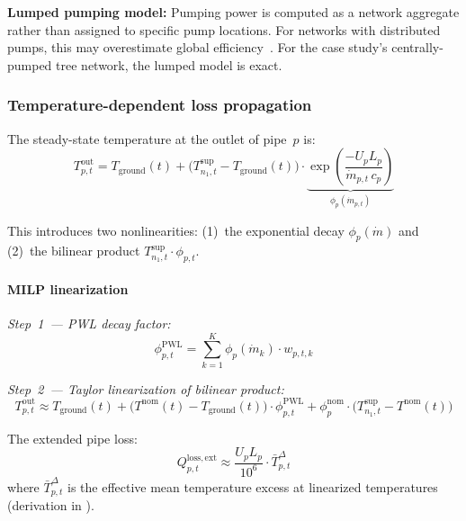 \documentclass[review,3p]{elsarticle}
\begin{document}
\textbf{Lumped pumping model:} Pumping power is computed as a network
aggregate rather than assigned to specific pump locations. For
networks with distributed pumps, this may overestimate global
efficiency~\cite{Hari2024}. For the case study's centrally-pumped tree
network, the lumped model is exact.

\subsubsection{Temperature-dependent loss propagation}
\label{sec:model_temp_prop}

The steady-state temperature at the outlet of pipe~$p$ is:
%
\begin{equation}
  T_{p,t}^{\mathrm{out}} = T_{\mathrm{ground}}(t)
    + \bigl(T_{n_1,t}^{\mathrm{sup}} - T_{\mathrm{ground}}(t)\bigr)
    \cdot \underbrace{\exp\!\left(
      \frac{-U_p L_p}{\dot{m}_{p,t}\, c_p}
    \right)}_{\displaystyle\phi_p(\dot{m}_{p,t})}
  \label{eq:temp_prop}
\end{equation}

This introduces two nonlinearities: (1)~the exponential decay
$\phi_p(\dot{m})$ and (2)~the bilinear product
$T_{n_1,t}^{\mathrm{sup}} \cdot \phi_{p,t}$.

\paragraph{MILP linearization}
\emph{Step~1~--- PWL decay factor:}
\begin{equation}
  \phi_{p,t}^{\mathrm{PWL}} = \sum_{k=1}^{K}
    \phi_p(\dot{m}_k) \cdot w_{p,t,k}
  \label{eq:decay_pwl}
\end{equation}

\emph{Step~2~--- Taylor linearization of bilinear product:}
\begin{equation}
  T_{p,t}^{\mathrm{out}} \approx T_{\mathrm{ground}}(t)
    + \bigl(T^{\mathrm{nom}}(t) - T_{\mathrm{ground}}(t)\bigr)
      \cdot \phi_{p,t}^{\mathrm{PWL}}
    + \phi^{\mathrm{nom}}_p
      \cdot \bigl(T_{n_1,t}^{\mathrm{sup}} - T^{\mathrm{nom}}(t)\bigr)
  \label{eq:temp_prop_lin}
\end{equation}

The extended pipe loss:
\begin{equation}
  Q_{p,t}^{\mathrm{loss,ext}} \approx
    \frac{U_p L_p}{10^6} \cdot \bar{T}_{p,t}^{\Delta}
  \label{eq:loss_ext_lin}
\end{equation}
where $\bar{T}_{p,t}^{\Delta}$ is the effective mean temperature
excess at linearized temperatures (derivation in
).
\end{document}
